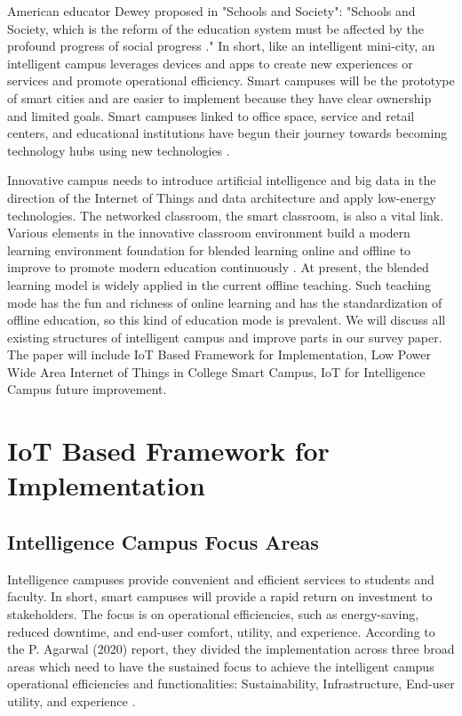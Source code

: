\documentclass[conference]{IEEEtran}
\begin{document}
American educator Dewey proposed in "Schools and Society":  "Schools and Society, which is the reform of  the education system must be affected by the profound progress of social progress \cite{INTCAMPUS:AnalysisApplication}." In short, like an intelligent mini-city, an intelligent campus leverages devices and apps to create new experiences or services and promote operational efficiency. Smart campuses will be the prototype of smart cities and are easier to implement because they have clear ownership and limited goals. Smart campuses linked to office space, service and retail centers, and educational institutions have begun their journey towards becoming technology hubs using new technologies \cite{INTCAMPUS:AppOfAI}. 

Innovative campus needs to introduce artificial intelligence and big data in the direction of the Internet of Things and data architecture and apply low-energy technologies. The networked classroom, the smart classroom, is also a vital link. Various elements in the innovative classroom environment build a modern learning environment foundation for blended learning online and offline to improve to promote modern education continuously \cite{INTCAMPUS:AppofIntClass}. At present, the blended learning model is widely applied in the current offline teaching. Such teaching mode has the fun and richness of online learning and has the standardization of offline education, so this kind of education mode is prevalent. We will discuss all existing structures of intelligent campus and improve parts in our survey paper. The paper will include IoT Based Framework for Implementation, Low Power Wide Area Internet of Things in College Smart Campus, IoT for Intelligence Campus future improvement. 

\section{IoT Based Framework for Implementation}

\subsection{Intelligence Campus Focus Areas}

Intelligence campuses provide convenient and efficient services to students and faculty. In short, smart campuses will provide a rapid return on investment to stakeholders. The focus is on operational efficiencies, such as energy-saving, reduced downtime, and end-user comfort, utility, and experience.  According to the P. Agarwal (2020) report, they divided the implementation across three broad areas which need to have the sustained focus to achieve the intelligent campus operational efficiencies and functionalities: Sustainability, Infrastructure, End-user utility, and experience \cite{INTCAMPUS:IoTbasedFrame}.
\end{document}
